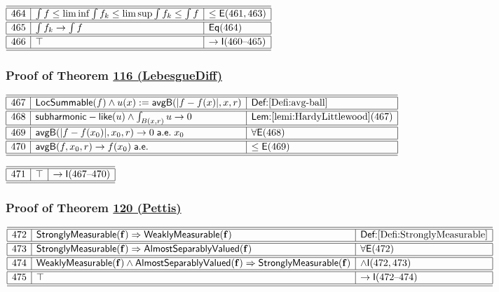 \documentclass[11pt,reqno]{amsart}
\begin{document}
\medskip

\noindent$%
\begin{array}{|r|l|l|}
\hline\hline
464 & \int f\le\liminf\int f_{k}\le\limsup\int f_{k}\le\int f & \le\mathsf{E}(461,463) \\ \hline\hline
465 & \int f_{k}\to\int f & \mathsf{Eq}(464) \\ \hline\hline
466 & \top & \to\mathsf{I}(460\text{--}465) \\ \hline\hline
\end{array}%
$

\medskip

\subsubsection*{Proof of Theorem \hyperlink{thm:LebesgueDiff}{116 (\textsf{LebesgueDiff})}}

\noindent$%
\begin{array}{|r|l|l|}
\hline\hline
467 & \mathsf{LocSummable}(f)\wedge u(x):=\mathsf{avgB}(|f-f(x)|,x,r) & \textsf{Def:}\ref{Defi:avg-ball} \\ \hline\hline
468 & \mathsf{subharmonic-like}(u)\wedge\int_{B(x,r)}u\to0 & \textsf{Lem:}\ref{lemi:HardyLittlewood}(467) \\ \hline\hline
469 & \mathsf{avgB}(|f-f(x_{0})|,x_{0},r)\to0\;\mathsf{a.e.}\;x_{0} & \forall\mathsf{E}(468) \\ \hline\hline
470 & \mathsf{avgB}(f,x_{0},r)\to f(x_{0})\;\mathsf{a.e.} & \le\mathsf{E}(469) \\ \hline\hline
\end{array}%
$

\medskip

\noindent$%
\begin{array}{|r|l|l|}
\hline\hline
471 & \top & \to\mathsf{I}(467\text{--}470) \\ \hline\hline
\end{array}%
$

\medskip

\subsubsection*{Proof of Theorem \hyperlink{thm:Pettis}{120 (\textsf{Pettis})}}

\noindent$%
\begin{array}{|r|l|l|}
\hline\hline
472 & \mathsf{StronglyMeasurable}(\mathbf{f})\Rightarrow\mathsf{WeaklyMeasurable}(\mathbf{f}) & \textsf{Def:}\ref{Defi:StronglyMeasurable} \\ \hline\hline
473 & \mathsf{StronglyMeasurable}(\mathbf{f})\Rightarrow\mathsf{AlmostSeparablyValued}(\mathbf{f}) & \forall\mathsf{E}(472) \\ \hline\hline
474 & \mathsf{WeaklyMeasurable}(\mathbf{f})\wedge\mathsf{AlmostSeparablyValued}(\mathbf{f})\Rightarrow\mathsf{StronglyMeasurable}(\mathbf{f}) & \land\mathsf{I}(472,473) \\ \hline\hline
475 & \top & \to\mathsf{I}(472\text{--}474) \\ \hline\hline
\end{array}%
$
\end{document}
